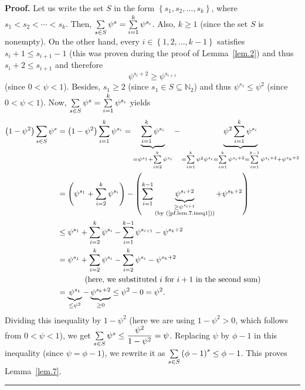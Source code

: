 \documentclass[numbers=enddot,12pt,final,onecolumn,notitlepage]{scrartcl}%
\numberwithin{exer}{section}
\theoremstyle{definition}
\newenvironment{proof}[1][Proof]{\noindent\textbf{#1.} }{\ \rule{0.5em}{0.5em}}
\let\sumnonlimits\sum
\renewcommand{\sum}{\sumnonlimits\limits}
\begin{document}
\begin{proof}
Let us write the set $S$ in the form $\left\{  s_{1},s_{2},\ldots
,s_{k}\right\}  $, where $s_{1}<s_{2}<\cdots<s_{k}$. Then, $\sum\limits_{s\in
S}\psi^{s}=\sum\limits_{i=1}^{k}\psi^{s_{i}}$. Also, $k\geq1$ (since the set
$S$ is nonempty). On the other hand, every $i\in\left\{  1,2,\ldots
,k-1\right\}  $ satisfies $s_{i}+1\leq s_{i+1}-1$ (this was proven during the
proof of Lemma~\ref{lem.2}) and thus $s_{i}+2\leq s_{i+1}$ and therefore%
\begin{equation}
\psi^{s_{i}+2}\geq\psi^{s_{i+1}}\label{pf.lem.7.ineq1}%
\end{equation}
(since $0<\psi<1$). Besides, $s_{1}\geq2$ (since $s_{1}\in S\subseteq
\mathbb{N}_{2}$) and thus $\psi^{s_{1}}\leq\psi^{2}$ (since $0<\psi<1$). Now,
$\sum\limits_{s\in S}\psi^{s}=\sum\limits_{i=1}^{k}\psi^{s_{i}}$ yields%
\begin{align*}
\left(  1-\psi^{2}\right)  \sum\limits_{s\in S}\psi^{s} &  =\left(  1-\psi
^{2}\right)  \sum\limits_{i=1}^{k}\psi^{s_{i}}=\underbrace{\sum\limits_{i=1}%
^{k}\psi^{s_{i}}}_{=\psi^{s_{1}}+\sum\limits_{i=2}^{k}\psi^{s_{i}}%
}-\underbrace{\psi^{2}\sum\limits_{i=1}^{k}\psi^{s_{i}}}_{=\sum\limits_{i=1}%
^{k}\psi^{2}\psi^{s_{i}}=\sum\limits_{i=1}^{k}\psi^{s_{i}+2}=\sum
\limits_{i=1}^{k-1}\psi^{s_{i}+2}+\psi^{s_{k}+2}}\\
&  =\left(  \psi^{s_{1}}+\sum\limits_{i=2}^{k}\psi^{s_{i}}\right)  -\left(
\sum\limits_{i=1}^{k-1}\underbrace{\psi^{s_{i}+2}}_{\substack{\geq
\psi^{s_{i+1}}\\\text{(by (\ref{pf.lem.7.ineq1}))}}}+\psi^{s_{k}+2}\right)  \\
&  \leq\psi^{s_{1}}+\sum\limits_{i=2}^{k}\psi^{s_{i}}-\sum\limits_{i=1}%
^{k-1}\psi^{s_{i+1}}-\psi^{s_{k}+2}\\
&  =\psi^{s_{1}}+\sum\limits_{i=2}^{k}\psi^{s_{i}}-\sum\limits_{i=2}^{k}%
\psi^{s_{i}}-\psi^{s_{k}+2}\\
&  \ \ \ \ \ \ \ \ \ \ \left(  \text{here, we substituted }i\text{ for
}i+1\text{ in the second sum}\right)  \\
&  =\underbrace{\psi^{s_{1}}}_{\leq\psi^{2}}-\underbrace{\psi^{s_{k}+2}}%
_{\geq0}\leq\psi^{2}-0=\psi^{2}.
\end{align*}
Dividing this inequality by $1-\psi^{2}$ (here we are using $1-\psi^{2}>0$,
which follows from $0<\psi<1$), we get $\sum\limits_{s\in S}\psi^{s}\leq
\dfrac{\psi^{2}}{1-\psi^{2}}=\psi$. Replacing $\psi$ by $\phi-1$ in this
inequality (since $\psi=\phi-1$), we rewrite it as $\sum\limits_{s\in
S}\left(  \phi-1\right)  ^{s}\leq\phi-1$. This proves Lemma~\ref{lem.7}.
\end{proof}
\end{document}
